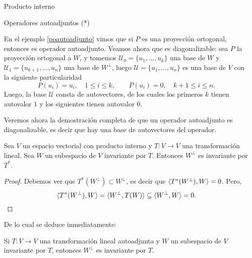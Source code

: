 \begin{chapter}{Producto interno}
\begin{section}{Operadores autoadjuntos (*)}
        
        \begin{ejemplo*}
            En el ejemplo \ref{poautoadjunto} vimos que si  $P$ es una proyección ortogonal, entonces es  operador autoadjunto. Veamos ahora que es diagonalizable: sea $P$ la proyección ortogonal a $W$, y tomemos $\mathcal{U}_0 = \{u_1,\ldots,u_k\}$ una base de $W$ y  $\mathcal{U}_1 = \{u_{k+1},\ldots,u_n\}$ una base de $W^\perp$, luego $\mathcal{U} = \{u_1,\ldots,u_n\}$ es una base de $V$ con la siguiente particularidad
            $$
            P(u_i) = u_i,\quad 1 \le i \le k, \qquad P(u_i) = 0,\quad k+1 \le i \le n.
            $$
            Luego, la base $\mathcal{U}$ consta de autovectores, de los  cuales los primeros $k$ tienen autovalor $1$ y los siguientes tienen autovalor $0$.
        \end{ejemplo*}
        
                
        Veremos ahora la demostración completa de que un operador autoadjunto es diagonalizable, es decir que hay una base de autovectores del operador. 

        \begin{proposicion}
                Sea $V$ un espacio vectorial con producto interno y $T: V \to V$ una transformación lineal. Sea $W$ un subespacio de $V$ invariante por $T$. Entonces $W^\perp$ es invariante por $T^*$.
        \end{proposicion}
        \begin{proof}
            Debemos ver que $T^*(W^\perp) \subset W^\perp$, es decir que $\langle T^*(W^\perp) , W \rangle = 0$. Pero,
            $$
            \langle T^*(W^\perp) , W \rangle = \langle W^\perp, T(W) \rangle \subseteq  \langle W^\perp, W \rangle =0.
            $$  
        \end{proof}
        
        De lo cual se deduce inmediatamente:
        
        \begin{corolario}\label{wperpinv}
            Si  $T: V \to V$ una transformación lineal autoadjunta y $W$ un subespacio de $V$ invariante por $T$, entonces $W^\perp$ es invariante por $T$.
        \end{corolario}
        

\end{section}
\end{chapter}
